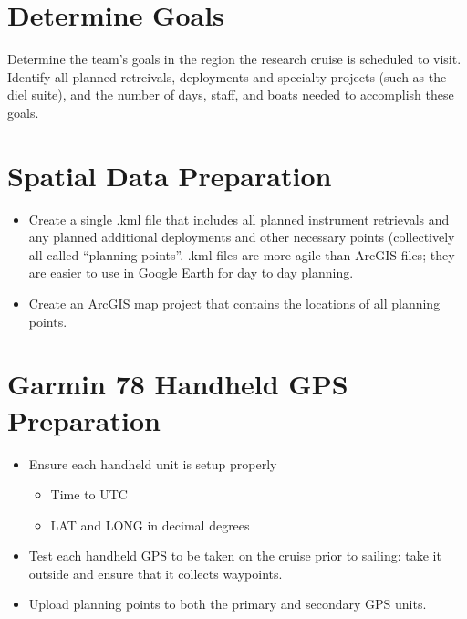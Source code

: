 \documentclass[]{book}
\providecommand{\tightlist}{%
  \setlength{\itemsep}{0pt}\setlength{\parskip}{0pt}}
\begin{document}
\hypertarget{determine-goals}{%
\section{Determine Goals}\label{determine-goals}}

Determine the team's goals in the region the research cruise is scheduled to visit. Identify all planned retreivals, deployments and specialty projects (such as the diel suite), and the number of days, staff, and boats needed to accomplish these goals.

\hypertarget{spatial-data-preparation}{%
\section{Spatial Data Preparation}\label{spatial-data-preparation}}

\begin{itemize}
\tightlist
\item
  Create a single .kml file that includes all planned instrument retrievals and any planned additional deployments and other necessary points (collectively all called ``planning points''. .kml files are more agile than ArcGIS files; they are easier to use in Google Earth for day to day planning.
\item
  Create an ArcGIS map project that contains the locations of all planning points.
\end{itemize}

\hypertarget{garmin-78-handheld-gps-preparation}{%
\section{Garmin 78 Handheld GPS Preparation}\label{garmin-78-handheld-gps-preparation}}

\begin{itemize}
\tightlist
\item
  Ensure each handheld unit is setup properly

  \begin{itemize}
  \tightlist
  \item
    Time to UTC
  \item
    LAT and LONG in decimal degrees
  \end{itemize}
\item
  Test each handheld GPS to be taken on the cruise prior to sailing: take it outside and ensure that it collects waypoints.
\item
  Upload planning points to both the primary and secondary GPS units.
\end{itemize}
\end{document}
